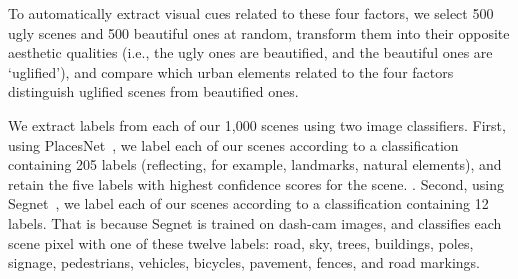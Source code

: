 To automatically extract visual cues related to these four factors, we select 500 ugly scenes and 500 beautiful ones at random, transform them into their opposite aesthetic qualities (i.e., the ugly ones are beautified, and the beautiful ones are `uglified'), and compare which urban elements related to the four factors distinguish uglified scenes from beautified ones. 

We extract labels from each of our 1,000 scenes using two image classifiers. First, using PlacesNet~\cite{zhou2014learning}, we label each of our scenes according to a classification containing 205 labels (reflecting, for example, landmarks, natural elements), and retain the five labels with highest confidence scores for the scene. . Second, using Segnet~\cite{badrinarayanan2015segnet}, we  label each of our scenes according to a classification containing 12 labels. That is because Segnet is trained on dash-cam images, and classifies each scene pixel with one of these twelve labels: road, sky, trees,  buildings, poles, signage, pedestrians, vehicles, bicycles, pavement, fences, and road markings. 


